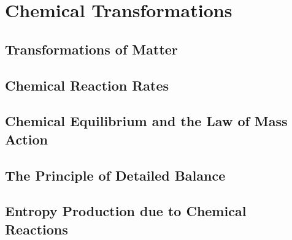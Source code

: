 \chapter{Chemical Transformations}
\section{Transformations of Matter}
\section{Chemical Reaction Rates}
\section{Chemical Equilibrium and the Law of Mass Action}
\section{The Principle of Detailed Balance}
\section{Entropy Production due to Chemical Reactions}
